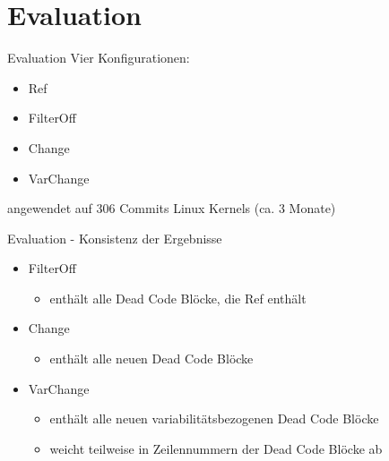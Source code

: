 \documentclass[aspectratio=43, noserifmath]{beamer}
\begin{document}
\section{Evaluation}

\begin{frame}{Evaluation}
Vier Konfigurationen:
\begin{itemize}
    \item[\textbullet] Ref
    \item[\textbullet] FilterOff
    \item[\textbullet] Change
    \item[\textbullet] VarChange
\end{itemize}
angewendet auf 306 Commits Linux Kernels (ca. 3 Monate)
\end{frame}


\begin{frame}{Evaluation - Konsistenz der Ergebnisse}

\begin{itemize}
    \item FilterOff\\
    \begin{itemize}
        \item enth\"alt \alert{alle} Dead Code Bl\"ocke, die Ref enth\"alt
    \end{itemize}
    \item Change \\
    \begin{itemize}
        \item enth\"alt \alert{alle neuen} Dead Code Bl\"ocke
    \end{itemize}
    \item VarChange\\
    \begin{itemize}
        \item enth\"alt \alert{alle neuen variabilit\"atsbezogenen} Dead Code Bl\"ocke
        \item weicht teilweise in Zeilennummern der Dead Code Bl\"ocke ab
    \end{itemize}
\end{itemize}    
\end{frame}
\end{document}
